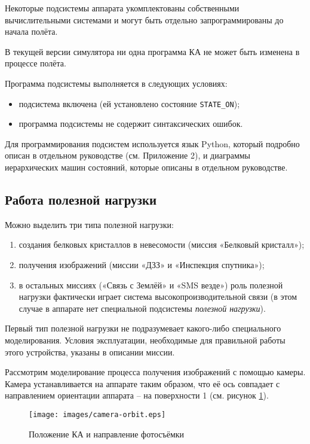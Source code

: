 \documentclass[12pt,a4paper]{article}
\begin{document}
Некоторые подсистемы аппарата укомплектованы собственными вычислительными системами и
могут быть отдельно запрограммированы до начала полёта.

В текущей версии симулятора ни одна программа КА не может быть изменена в процессе полёта.

Программа подсистемы выполняется в следующих условиях:

\begin{itemize}
\item подсистема включена (ей установлено состояние \verb'STATE_ON');
\item программа подсистемы не содержит синтаксических ошибок.
\end{itemize}
  
Для программирования подсистем используется язык Python, который подробно описан в
отдельном руководстве (см. Приложение 2), и диаграммы иерархических машин состояний,
которые описаны в отдельном руководстве.

\subsection{Работа полезной нагрузки}
\label{Sec:Load}

Можно выделить три типа полезной нагрузки:

\begin{enumerate}
\item создания белковых кристаллов в невесомости (миссия «Белковый кристалл»);
\item получения изображений (миссии «ДЗЗ» и «Инспекция спутника»);
\item в остальных миссиях («Связь с Землёй» и «SMS везде») роль полезной нагрузки
  фактически играет система высокопроизводительной связи (в этом случае в аппарате нет
  специальной подсистемы \emph{полезной нагрузки}).
\end{enumerate}
  
Первый тип полезной нагрузки не подразумевает какого-либо специального
моделирования. Условия эксплуатации, необходимые для правильной работы этого устройства,
указаны в описании миссии.

Рассмотрим моделирование процесса получения изображений с помощью камеры. Камера
устанавливается на аппарате таким образом, что её ось совпадает с направлением ориентации
аппарата – на поверхности 1 (см. рисунок \ref{Pic:Camera-Orbit}).

\begin{figure}[tbh]
  \begin{center}
    \texttt{[image: images/camera-orbit.eps]}
    \caption{Положение КА и направление фотосъёмки}
    \label{Pic:Camera-Orbit}
  \end{center}
\end{figure}
\end{document}
